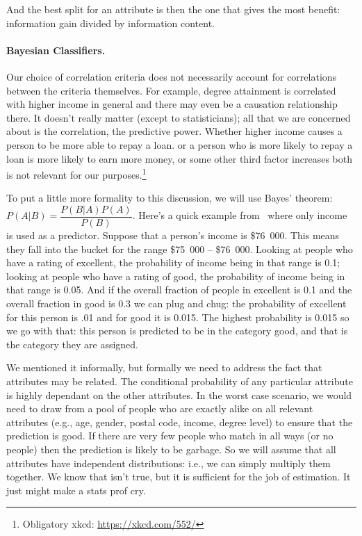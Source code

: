 And the best split for an attribute is then the one that gives the most benefit: information gain divided by information content.

\paragraph{Bayesian Classifiers.} Our choice of correlation criteria does not necessarily account for correlations between the criteria themselves. For example, degree attainment is correlated with higher income  in general and there may even be a causation relationship there. It doesn't really matter (except to statisticians); all that we are concerned about is the correlation, the predictive power. Whether higher income causes a person to be more able to repay a loan. or a person who is more likely to repay a loan is more likely to earn more money, or some other third factor increases both is not relevant for our purposes.\footnote{Obligatory xkcd: \url{https://xkcd.com/552/} }

To put a little more formality to this discussion, we will use Bayes' theorem: $P(A|B) = \dfrac{P(B|A)P(A)}{P(B)}$. Here's a quick example  from~\cite{dsc} where only income is used as a predictor. Suppose that a person's income is \$76~000. This means they fall into the bucket for the range \$75~000 -- \$76~000. Looking at people who have a rating of excellent, the probability of income being in that range is 0.1; looking at people who have a rating of good, the probability of income being in that range is 0.05. And if the overall fraction of people in excellent is 0.1 and the overall fraction in good is 0.3 we can plug and chug: the probability of excellent for this person is .01 and for good it is 0.015. The highest probability is 0.015 so we go with that: this person is predicted to be in the category good, and that is the category they are assigned.

We mentioned it informally, but formally we need to address the fact that attributes may be related. The conditional probability of any particular attribute is highly dependant on the other attributes. In the worst case scenario, we would need to draw from a pool of people who are exactly alike on all relevant attributes (e.g., age, gender, postal code, income, degree level) to ensure that the prediction is good. If there are very few people who match in all ways (or no people) then the prediction is likely to be garbage.  So we will assume that all attributes have independent distributions: i.e., we can simply multiply them together. We know that isn't true, but it is sufficient for the job of estimation. It just might make a stats prof cry.

